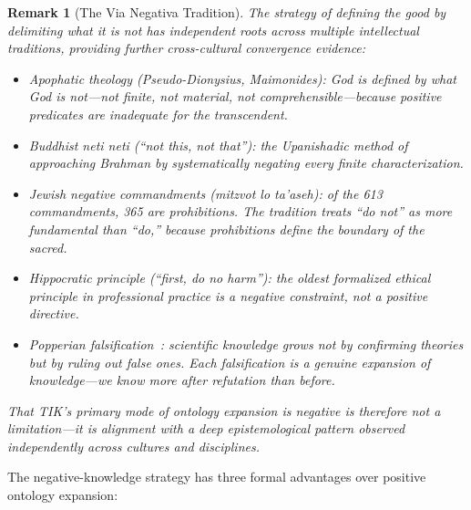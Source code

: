 \documentclass[11pt]{article}
\newtheorem{remark}{Remark}
\begin{document}
\begin{remark}[The Via Negativa Tradition]
\label{rem:via-negativa}
The strategy of defining the good by delimiting what it is \textit{not} has
independent roots across multiple intellectual traditions, providing further
cross-cultural convergence evidence:
\begin{itemize}
\item \textit{Apophatic theology} (Pseudo-Dionysius, Maimonides): God is
      defined by what God is \textit{not}---not finite, not material, not
      comprehensible---because positive predicates are inadequate for the
      transcendent.
\item \textit{Buddhist \textup{neti neti}} (``not this, not that''): the
      Upanishadic method of approaching Brahman by systematically negating
      every finite characterization.
\item \textit{Jewish negative commandments} (\textup{mitzvot lo ta'aseh}):
      of the 613 commandments, 365 are prohibitions. The tradition treats
      ``do not'' as more fundamental than ``do,'' because prohibitions define
      the boundary of the sacred.
\item \textit{Hippocratic principle} (``first, do no harm''): the oldest
      formalized ethical principle in professional practice is a negative
      constraint, not a positive directive.
\item \textit{Popperian falsification}~\citep{popper1959}: scientific
      knowledge grows not by confirming theories but by ruling out false ones.
      Each falsification is a genuine expansion of knowledge---we know more
      after refutation than before.
\end{itemize}
That TIK's primary mode of ontology expansion is negative is therefore not a
limitation---it is alignment with a deep epistemological pattern observed
independently across cultures and disciplines.
\end{remark}

The negative-knowledge strategy has three formal advantages over positive
ontology expansion:
\end{document}
